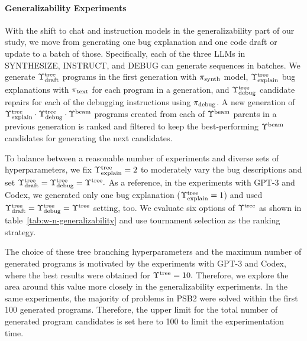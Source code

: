 \paragraph{Generalizability Experiments}
\label{sec:seidr-tree arity-ollama} 
With the shift to chat and instruction models in the generalizability part of our study, we move from generating one bug explanation and one code draft or update to a batch of those. 
Specifically, each of the three LLMs in SYNTHESIZE, INSTRUCT, and DEBUG  can generate sequences in batches. 
We generate $\Upsilon^\text{tree}_\text{draft}$ programs in the first generation with $ \pi_\text{synth} $ model, $\Upsilon^\text{tree}_\text{explain}$ bug explanations with $ \pi_\text{text} $ for each program in a generation, and $\Upsilon^\text{tree}_\text{debug}$ candidate repairs for each of the debugging instructions using $ \pi_\text{debug} $.
A new generation of $\Upsilon^\text{tree}_\text{explain} \cdot \Upsilon^\text{tree}_\text{debug} \cdot \Upsilon^\text{beam}{}$ programs created from each of $ \Upsilon^\text{beam}{}$ parents in a previous generation is ranked and filtered to keep the best-performing $\Upsilon^\text{beam}{}$ candidates for generating the next candidates. 

To balance between a reasonable number of experiments and diverse sets of hyperparameters, we fix $\Upsilon^\text{tree}_\text{explain}=2$ to moderately vary the bug descriptions and set $\Upsilon^\text{tree}_\text{draft} = \Upsilon^\text{tree}_\text{debug} = \Upsilon^\text{tree}{}.$
As a reference, in the experiments with GPT-3 and Codex, we generated only one bug explanation ($\Upsilon^\text{tree}_\text{explain} = 1$) and used $\Upsilon^\text{tree}_\text{draft} = \Upsilon^\text{tree}_\text{debug} = \Upsilon^\text{tree}{}$ setting, too. 
We evaluate six options of $\Upsilon^\text{tree}{}$ 
as shown in table~\ref{tab:w-n-generalizability} and use tournament selection as the ranking strategy. 

The choice of these tree branching hyperparameters and the maximum number of generated programs is motivated by the experiments with GPT-3 and Codex, where the best results were obtained for $\Upsilon^\text{tree}{}=10.$ 
Therefore, we explore the area around this value more closely in the generalizability experiments.
In the same experiments, the majority of problems in PSB2 were solved within the first 100 generated programs.
Therefore, the upper limit for the total number of generated program candidates is set here to 100 to limit the experimentation time.

